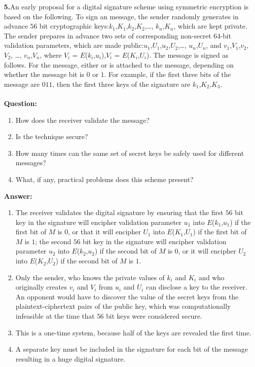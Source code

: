 \documentclass[paper=a4, fontsize=11pt]{scrartcl} %
\numberwithin{equation}{section} %
\numberwithin{figure}{section} %
\numberwithin{table}{section} %
\begin{document}
\textbf{5.}An early proposal for a digital signature scheme using symmetric encryption is based on the following. To sign an message, the sender randomly generates in advance $56$ bit cryptographic keys:$k_1$,$K_1$,$k_2$,$K_2$,\ldots, $k_n$,$K_n$, which are kept private. The sender prepares in advance two sets of corresponding non-secret 64-bit validation parameters, which are made public:$u_1$,$U_1$,$u_2$,$U_2$,\ldots, $u_n$,$U_n$, and $v_1$,$V_1$,$v_2$,$V_2$, \ldots, $v_n$,$V_n$, where $V_i$ = $E$($k_i$,$u_i$),$V_i$ = $E$($K_i$,$U_i$). The message is signed as follows. For the message, either or is attached to the message, depending on whether the message bit is $0$ or $1$. For example, if the first three bits of the message are $011$, then the first three keys of the signature are $k_1$,$K_2$,$K_3$.
\\
\\
\textbf{Question:}
\begin{enumerate}
\item How does the receiver validate the message?
\item Is the technique secure?
\item How many times can the same set of secret keys be safely used for different messages?
\item What, if any, practical problems does this scheme present?
\end{enumerate}

\textbf{Answer:}
\begin{enumerate}
\item The receiver validates the digital signature by ensuring that the first $56$ bit key in the signature will encipher validation parameter $u_1$ into $E$($k_1$,$u_1$) if the first bit of $M$ is $0$, or that it will encipher $U_1$ into $E$($K_1$,$U_1$) if the first bit of $M$ is $1$; the second $56$ bit key in the signature will encipher validation parameter $u_2$ into $E$($k_2$,$u_2$) if the second bit of $M$ is $0$, or it will encipher $U_2$ into $E$($K_2$,$U_2$) if the second bit of $M$ is $1$.
\item Only the sender, who knows the private values of $k_i$ and $K_i$ and who originally creates $v_i$ and $V_i$ from $u_i$ and $U_i$ can disclose a key to the receiver. An opponent would have to discover the value of the secret keys from the plaintext-ciphertext pairs of the public key, which was computationally infeasible at the time that $56$ bit keys were considered secure.
\item This is a one-time system, because half of the keys are revealed the first time.
\item A separate key must be included in the signature for each bit of the message resulting in a huge digital signature.
\end{enumerate}
\end{document}
